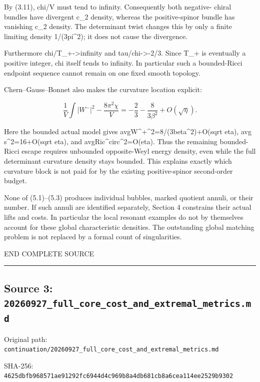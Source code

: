 \documentclass[
  10pt,
]{article}
\begin{document}
By (3.11), chi/V must tend to infinity. Consequently both negative-
chiral bundles have divergent c\_2 density, whereas the positive-spinor
bundle has vanishing c\_2 density. The determinant twist changes this by
only a finite limiting density 1/(3pi\^{}2); it does not cause the
divergence.

Furthermore chi/T\_+-\textgreater infinity and tau/chi-\textgreater-2/3.
Since T\_+ is eventually a positive integer, chi itself tends to
infinity. In particular such a bounded-Ricci endpoint sequence cannot
remain on one fixed smooth topology.

Chern--Gauss--Bonnet also makes the curvature location explicit:

\[
 \frac1V\int|W^-|^2-\frac{8\pi^2\chi}{V}
                  =-\frac23-\frac8{3\beta^2}+O(\sqrt\eta).      \tag{5.3}
\]

Here the bounded actual model gives
avg\textbar W\^{}+\textbar\^{}2=8/(3beta\^{}2)+O(sqrt eta), avg
s\^{}2=16+O(sqrt eta), and avg\textbar Ric\^{}circ\textbar\^{}2=O(eta).
Thus the remaining bounded-Ricci escape requires unbounded opposite-Weyl
energy density, even while the full determinant curvature density stays
bounded. This explains exactly which curvature block is not paid for by
the existing positive-spinor second-order budget.

None of (5.1)--(5.3) produces individual bubbles, marked quotient
annuli, or their number. If such annuli are identified separately,
Section 4 constrains their actual lifts and costs. In particular the
local resonant examples do not by themselves account for these global
characteristic densities. The outstanding global matching problem is not
replaced by a formal count of singularities.

END COMPLETE SOURCE

\begin{center}\rule{0.5\linewidth}{0.5pt}\end{center}

\hypertarget{source-3-20260927_full_core_cost_and_extremal_metrics.md}{%
\subsection{Source 3:
\nolinkurl{20260927_full_core_cost_and_extremal_metrics.md}}\label{source-3-20260927_full_core_cost_and_extremal_metrics.md}}

Original path:
\nolinkurl{continuation/20260927_full_core_cost_and_extremal_metrics.md}

SHA-256:
\nolinkurl{4625dbfb968571ae91292fc6944d4c969b8a4db681cb8a6cea114ee2529b9302}
\end{document}
